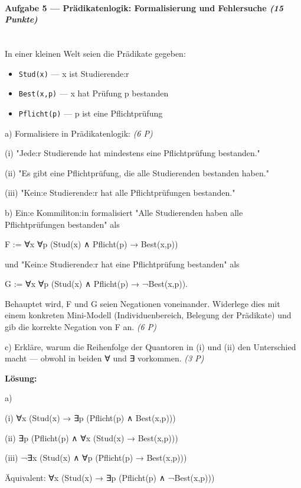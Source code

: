 \documentclass[11pt, a4paper]{article}
\begin{document}
\paragraph{Aufgabe 5 — Prädikatenlogik: Formalisierung und Fehlersuche \textit{(15 Punkte)}}\mbox{}\\[2pt]

In einer kleinen Welt seien die Prädikate gegeben:

\begin{itemize}
  \item \texttt{Stud(x)} — x ist Studierende:r
  \item \texttt{Best(x,p)} — x hat Prüfung p bestanden
  \item \texttt{Pflicht(p)} — p ist eine Pflichtprüfung
\end{itemize}

a) Formalisiere in Prädikatenlogik: \textit{(6 P)}

(i) "Jede:r Studierende hat mindestens eine Pflichtprüfung bestanden."

(ii) "Es gibt eine Pflichtprüfung, die alle Studierenden bestanden haben."

(iii) "Kein:e Studierende:r hat alle Pflichtprüfungen bestanden."


b) Ein:e Kommiliton:in formalisiert "Alle Studierenden haben alle Pflichtprüfungen bestanden" als

F := ∀x ∀p (Stud(x) ∧ Pflicht(p) → Best(x,p))

und "Kein:e Studierende:r hat eine Pflichtprüfung bestanden" als

G := ∀x ∀p (Stud(x) ∧ Pflicht(p) → ¬Best(x,p)).


Behauptet wird, F und G seien Negationen voneinander. Widerlege dies mit einem konkreten Mini-Modell (Individuenbereich, Belegung der Prädikate) und gib die korrekte Negation von F an. \textit{(6 P)}


c) Erkläre, warum die Reihenfolge der Quantoren in (i) und (ii) den Unterschied macht — obwohl in beiden ∀ und ∃ vorkommen. \textit{(3 P)}


\textbf{Lösung:}


a)

(i) ∀x (Stud(x) → ∃p (Pflicht(p) ∧ Best(x,p)))

(ii) ∃p (Pflicht(p) ∧ ∀x (Stud(x) → Best(x,p)))

(iii) ¬∃x (Stud(x) ∧ ∀p (Pflicht(p) → Best(x,p)))

Äquivalent: ∀x (Stud(x) → ∃p (Pflicht(p) ∧ ¬Best(x,p)))
\end{document}
